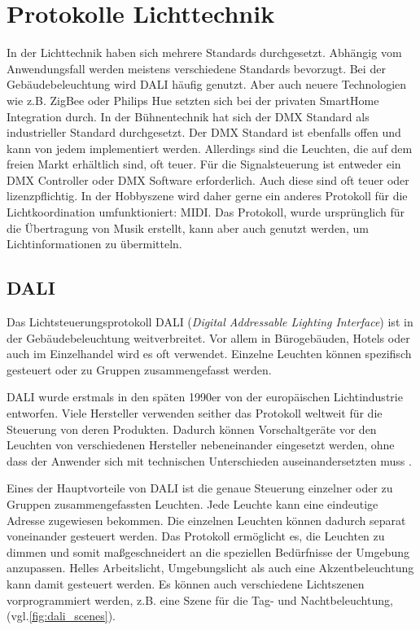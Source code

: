 \chapter{Protokolle Lichttechnik}

In der Lichttechnik haben sich mehrere Standards durchgesetzt. Abhängig vom Anwendungsfall werden meistens verschiedene Standards bevorzugt. Bei der Gebäudebeleuchtung wird DALI häufig genutzt. Aber auch neuere Technologien wie z.B. ZigBee oder Philips Hue setzten sich bei der privaten SmartHome Integration durch. In der Bühnentechnik hat sich der DMX Standard als industrieller Standard durchgesetzt. Der DMX Standard ist ebenfalls offen und kann von jedem implementiert werden. Allerdings sind die Leuchten, die auf dem freien Markt erhältlich sind, oft teuer.  Für die Signalsteuerung ist entweder ein DMX Controller oder DMX Software erforderlich. Auch diese sind oft teuer  oder lizenzpflichtig. In der Hobbyszene wird daher gerne ein anderes Protokoll für die Lichtkoordination umfunktioniert: MIDI. Das Protokoll, wurde ursprünglich für die Übertragung von Musik erstellt, kann aber auch genutzt werden, um Lichtinformationen zu übermitteln.


\section{DALI}
Das Lichtsteuerungsprotokoll DALI (\emph{Digital Addressable Lighting Interface}) ist in der Gebäudebeleuchtung weitverbreitet. Vor allem in Bürogebäuden, Hotels oder auch im Einzelhandel wird es oft verwendet. Einzelne Leuchten können spezifisch gesteuert oder zu Gruppen zusammengefasst werden.

DALI wurde erstmals in den späten 1990er \cite{DALI-2_certification} von der europäischen Lichtindustrie entworfen. Viele Hersteller verwenden seither das Protokoll weltweit für die Steuerung von deren Produkten. Dadurch können Vorschaltgeräte vor den Leuchten von verschiedenen Hersteller nebeneinander eingesetzt werden, ohne dass der Anwender sich mit technischen Unterschieden auseinandersetzten muss \cite[S.2, ch. 3.1]{DALI-Lichtmanagement}.

Eines der Hauptvorteile von DALI ist die genaue Steuerung einzelner oder zu Gruppen zusammengefassten Leuchten. Jede Leuchte kann eine eindeutige Adresse zugewiesen bekommen. Die einzelnen Leuchten können dadurch separat voneinander gesteuert werden\cite[S.2, ch. 3.1]{DALI-Lichtmanagement}. Das Protokoll ermöglicht es, die Leuchten zu dimmen und somit maßgeschneidert an die speziellen Bedürfnisse der Umgebung anzupassen. Helles Arbeitslicht, Umgebungslicht als auch eine Akzentbeleuchtung kann damit gesteuert werden. Es können auch verschiedene Lichtszenen vorprogrammiert werden, z.B. eine Szene für die Tag- und Nachtbeleuchtung, (vgl.\ref{fig:dali_scenes}).

